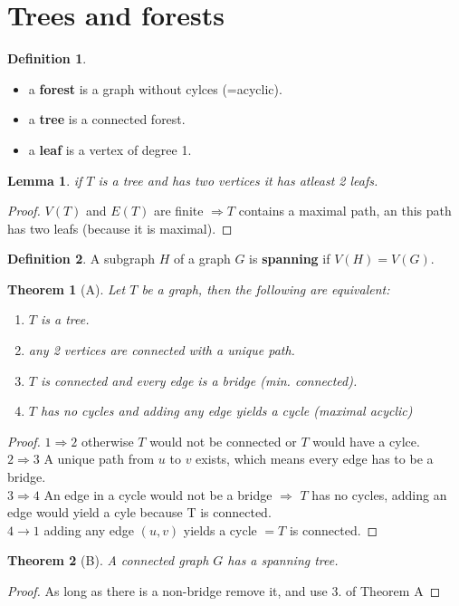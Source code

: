 \documentclass{article}
\newtheorem*{theorem}{Theorem}
\newtheorem*{lemma}{Lemma}
\theoremstyle{definition}
\newtheorem*{definition}{Definition}
\theoremstyle{remark}
\begin{document}
\section*{Trees and forests}
\begin{definition}
    $ $\\
    \begin{itemize}
        \item a \textbf{forest} is a graph without cylces (=acyclic).
        \item a \textbf{tree} is a connected forest.
        \item a \textbf{leaf} is a vertex of degree 1.
    \end{itemize}
\end{definition}
\begin{lemma}
    if $T$ is a tree and has two vertices it has atleast 2 leafs.
\end{lemma}
\begin{proof}
    $V(T) $ and $E(T)$ are finite $\Rightarrow T$ contains a maximal path, an this path has two leafs (because it is maximal).
\end{proof}
\begin{definition}
    A subgraph $H$ of a graph $G$ is \textbf{spanning} if $V(H) = V(G)$.
\end{definition}
\begin{theorem}[A]
    Let $T$ be a graph, then the following are equivalent:
    \begin{enumerate}
        \item $T$ is a tree.
        \item any 2 vertices are connected with a unique path.
        \item $T$ is connected and every edge is a bridge (min. connected).
        \item $T$ has no cycles and adding any edge yields a cycle (maximal acyclic)
    \end{enumerate}
\end{theorem}
\begin{proof}
    $1\Rightarrow 2$ otherwise $T$ would not be connected or $T$ would have a cylce.\\
    $2 \Rightarrow 3$ A unique path from $u$ to $v$ exists, which means every edge has to be a bridge.\\
    $3 \Rightarrow 4$ An edge in a cycle would not be a bridge $\Rightarrow$ $T$ has no cycles, adding an edge would yield a cyle because T is connected.\\
    $4 \rightarrow 1$ adding any edge $(u,v)$ yields a cycle $= T$ is connected.
\end{proof}
\begin{theorem}[B]
    A connected graph $G$ has a spanning tree.
\end{theorem}
\begin{proof}
    As long as there is a non-bridge remove it, and use 3. of Theorem A
\end{proof}
\end{document}
